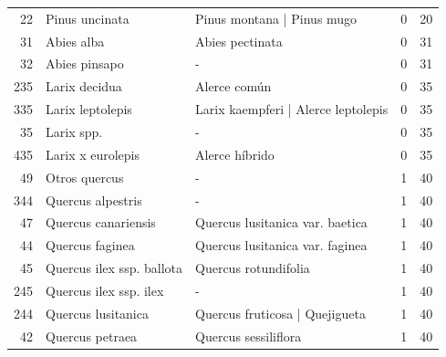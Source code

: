 \begin{longtable}{r p{4cm} p{5cm} c c}
    22            & Pinus uncinata                    & Pinus montana | Pinus mugo                    & 0             & 20             \\
    31            & Abies alba                        & Abies pectinata                               & 0             & 31             \\
    32            & Abies pinsapo                     & -                                             & 0             & 31             \\
    235           & Larix decidua                     & Alerce común                                  & 0             & 35             \\
    335           & Larix leptolepis                  & Larix kaempferi | Alerce leptolepis           & 0             & 35             \\
    35            & Larix spp.                        & -                                             & 0             & 35             \\
    435           & Larix x eurolepis                 & Alerce híbrido                                & 0             & 35             \\
    49            & Otros quercus                     & -                                             & 1             & 40             \\
    344           & Quercus alpestris                 & -                                             & 1             & 40             \\
    47            & Quercus canariensis               & Quercus lusitanica var. baetica               & 1             & 40             \\
    44            & Quercus faginea                   & Quercus lusitanica var. faginea               & 1             & 40             \\
    45            & Quercus ilex ssp. ballota         & Quercus rotundifolia                          & 1             & 40             \\
    245           & Quercus ilex ssp. ilex            & -                                             & 1             & 40             \\
    244           & Quercus lusitanica                & Quercus fruticosa | Quejigueta                & 1             & 40             \\
    42            & Quercus petraea                   & Quercus sessiliflora                          & 1             & 40             \\

\end{longtable}

